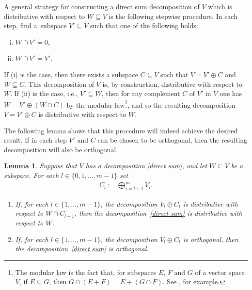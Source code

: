 \documentclass[pdftex]{sigma}
\numberwithin{equation}{section}
\newtheorem{Lemma}[Theorem]{Lemma}
\begin{document}
\begin{Remark}\label{modular iteration} A general strategy for constructing a direct sum decomposition of $V$ which is distributive with respect to $W \subseteq V$ is the following stepwise procedure.
In each step, f\/ind a~subspace $V' \subseteq V$ such that one of the following holds:
\begin{enumerate}[(i)]\itemsep=0pt
\item $W \cap V' = 0$,
\item $W \cap V' = V'$.
\end{enumerate}
If (i) is the case, then there exists a subspace $C \subseteq V$ such that $V = V' \oplus C$ and $W \subseteq C$. This decomposition of $V$ is, by construction, distributive with respect to $W$. If (ii) is the case, i.e., $V' \subseteq W$, then for any complement $C$ of $V'$ in $V$ one has $W = V' \oplus (W \cap C)$ by the modular law\footnote{The modular law is the fact that, for subspaces $E$, $F$ and $G$ of a vector space $V$, if $E \subseteq G$, then  $G \cap (E + F) = E + (G \cap F)$. See \cite[p.~56]{Roman}, for example.}, and so the resulting decomposition $V = V' \oplus C$ is distributive with respect to $W$.
\end{Remark}

The following lemma shows that this procedure will indeed achieve the desired result. If in each step $V'$ and $C$ can be chosen to be orthogonal, then the resulting decomposition will also be orthogonal.

\begin{Lemma}\label{distributive filter}
Suppose that  $V$ has a decomposition \eqref{direct sum}, and let $W \subseteq V$ be a subspace.
For each $l \in \{0,1,\dots ,m-1\}$ set
\begin{gather*}
C_l := \bigoplus_{i=l+1}^m V_i.
\end{gather*}
\begin{enumerate}[{\rm (i)}]\itemsep=0pt
\item If, for each $l \in \{1,\dots ,m-1\}$, the decomposition $V_l \oplus C_{l}$ is distributive with respect to $W \cap C_{l-1}$, then the decomposition~\eqref{direct sum} is distributive with respect to $W$.
\item If, for each $l \in \{1,\dots ,m-1\}$, the decomposition $V_l \oplus C_{l}$ is orthogonal, then the decomposition~\eqref{direct sum} is orthogonal.
\end{enumerate}
\end{Lemma}
\end{document}
